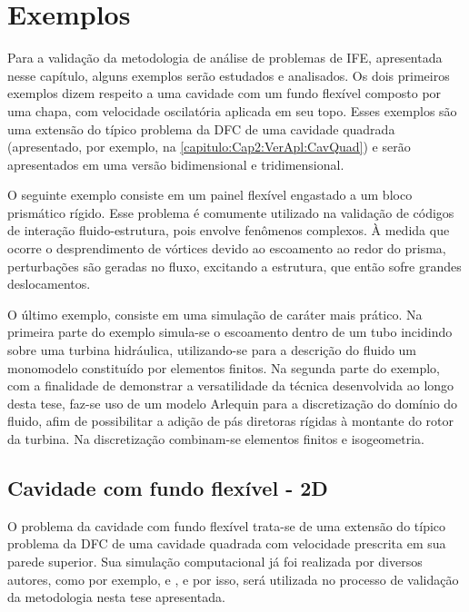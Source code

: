 \section{Exemplos}

Para a validação da metodologia de análise de problemas de IFE, apresentada nesse capítulo, alguns exemplos serão estudados e analisados. Os dois primeiros exemplos dizem respeito a uma cavidade com um fundo flexível composto por uma chapa, com velocidade oscilatória aplicada em seu topo. Esses exemplos são uma extensão do típico problema da DFC de uma cavidade quadrada (apresentado, por exemplo, na \autoref{capitulo:Cap2:VerApl:CavQuad}) e serão apresentados em uma versão bidimensional e tridimensional.

O seguinte exemplo consiste em um painel flexível engastado a um bloco prismático rígido. Esse problema é comumente utilizado na validação de códigos de interação fluido-estrutura, pois envolve fenômenos complexos. À medida que ocorre o desprendimento de vórtices devido ao escoamento ao redor do prisma, perturbações são geradas no fluxo, excitando a estrutura, que então sofre grandes deslocamentos.

O último exemplo, consiste em uma simulação de caráter mais prático. Na primeira parte do exemplo simula-se o escoamento dentro de um tubo incidindo sobre uma turbina hidráulica, utilizando-se para a descrição do fluido um monomodelo constituído por elementos finitos. Na segunda parte do exemplo, com a finalidade de demonstrar a versatilidade da técnica desenvolvida ao longo desta tese, faz-se uso de um modelo Arlequin para a discretização do domínio do fluido, afim de possibilitar a adição de pás diretoras rígidas à montante do rotor da turbina. Na discretização combinam-se elementos finitos e isogeometria.

\subsection{Cavidade com fundo flexível - 2D}

O problema da cavidade com fundo flexível trata-se de uma extensão do típico problema da DFC de uma cavidade quadrada com velocidade prescrita em sua parede superior. Sua simulação computacional já foi realizada por diversos autores, como por exemplo,  e , e  por isso, será utilizada no processo de validação da metodologia nesta tese apresentada.

